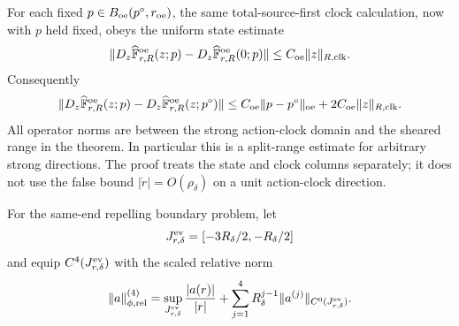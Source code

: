 \begin{lemma}
For each fixed \(p\in B_{\rm oe}(p^\circ,r_{\rm oe})\), the same
total-source-first clock calculation, now with \(p\) held fixed, obeys
the uniform state estimate
\begin{equation}
 \|D_z\widehat{\mathbb F}_{r,R}^{\rm oe}(z;p)
       -D_z\widehat{\mathbb F}_{r,R}^{\rm oe}(0;p)\|
 \le C_{\rm oe}\|z\|_{R,\rm clk}.              \label{eq:oe-family-fixed-parameter-state-operator}
\end{equation}
Consequently
\begin{equation}
 \|D_z\widehat{\mathbb F}_{r,R}^{\rm oe}(z;p)
       -D_z\widehat{\mathbb F}_{r,R}^{\rm oe}(z;p^\circ)\|
 \le C_{\rm oe}\|p-p^\circ\|_{\rm oe}
       +2C_{\rm oe}\|z\|_{R,\rm clk}.          \label{eq:oe-family-external-state-operator}
\end{equation}
All operator norms are between the strong action-clock domain and the
sheared range in the theorem.  In particular this is a split-range
estimate for arbitrary strong directions.  The proof treats the state and
clock columns separately; it does not use the false bound
\(|\dot r|=O(\rho_\delta)\) on a unit action-clock direction.
\end{lemma}

For the same-end repelling boundary problem, let
\begin{equation}
 J_{r,\delta}^{\rm ev}
 =[-3R_\delta/2,-R_\delta/2]                   \label{eq:moving-r-event-tube}
\end{equation}
and equip \(C^4(J_{r,\delta}^{\rm ev})\) with the scaled relative norm
\begin{equation}
 \|a\|_{\phi,\rm rel}^{(4)}
 =\sup_{J_{r,\delta}^{\rm ev}}\frac{|a(r)|}{|r|}
   +\sum_{j=1}^4R_\delta^{j-1}
       \|a^{(j)}\|_{C^0(J_{r,\delta}^{\rm ev})}.             \label{eq:moving-r-event-phase-norm}
\end{equation}

